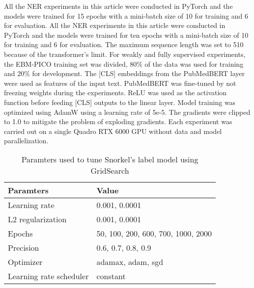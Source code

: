\documentclass[10.7pt,]{article}
\begin{document}
All the NER experiments in this article were conducted in PyTorch and the models were trained for 15 epochs with a mini-batch size of 10 for training and 6 for evaluation.
All the NER experiments in this article were conducted in PyTorch and the models were trained for ten epochs with a mini-batch size of 10 for training and 6 for evaluation.
The maximum sequence length was set to 510 because of the transformer's limit.
For weakly and fully supervised experiments, the EBM-PICO training set was divided, 80\% of the data was used for training and 20\% for development.
The [CLS] embeddings from the PubMedBERT layer were used as features of the input text.
PubMedBERT was fine-tuned by not freezing weights during the experiments.
ReLU was used as the activation function before feeding [CLS] outputs to the linear layer.
Model training was optimized using AdamW using a learning rate of 5e-5.
The gradients were clipped to 1.0 to mitigate the problem of exploding gradients.
Each experiment was carried out on a single Quadro RTX 6000 GPU without data and model parallelization.
%
\begin{table}[ht]
\centering
\begin{tabular}{|l|l|}
\hline
Paramters               & Value                              \\
\hline
Learning rate           & 0.001, 0.0001                      \\
L2 regularization       & 0.001, 0.0001                      \\
Epochs                  & 50, 100, 200, 600, 700, 1000, 2000 \\
Precision               & 0.6, 0.7, 0.8, 0.9                 \\
Optimizer               & adamax, adam, sgd                  \\
Learning rate scheduler & constant                           \\
\hline
\end{tabular}
\caption{\label{lm:params} Paramters used to tune Snorkel's label model using GridSearch}
\end{table}
% 


%
%
%


\end{document}
